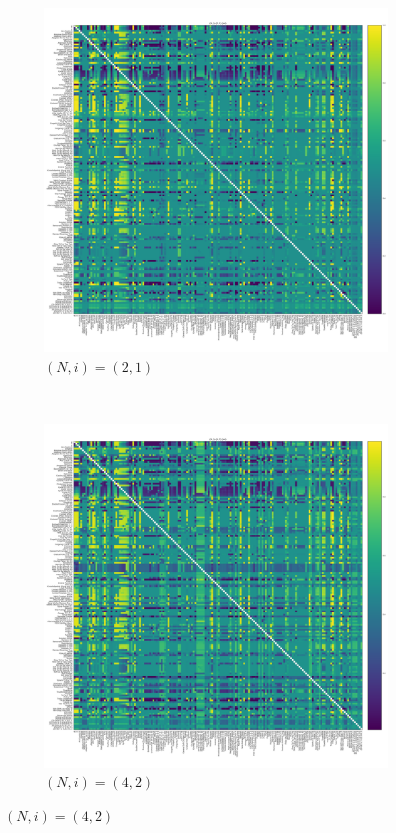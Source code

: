 \documentclass{article}
\begin{document}
\begin{figure}[!hbtp]
    \centering
    \begin{subfigure}[t]{.3\textwidth}
        \centering
        \includegraphics[width=.8\textwidth]{../img/fixation_heatmap_2_1_std.pdf}
        \caption{\((N,i)=(2, 1)\)}
    \end{subfigure}%
    ~
    \begin{subfigure}[t]{.3\textwidth}
        \centering
        \includegraphics[width=.8\textwidth]{../img/fixation_heatmap_4_2_std.pdf}
        \caption{\((N,i)=(4, 2)\)}
    \end{subfigure}%

\end{figure}
\end{document}
